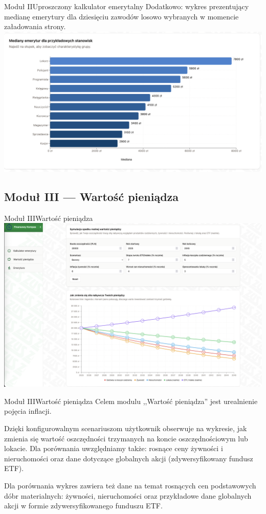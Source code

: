 \begin{frame}[t]{Moduł II}{Uproszczony kalkulator emerytalny}
Dodatkowo: wykres prezentujący medianę emerytury dla dziesięciu zawodów
losowo wybranych w momencie załadowania strony.
\\[2em]
\includegraphics[width=.8\textwidth]{img/module_2b_median_pensions}
\end{frame}

\subsection{Moduł III --- Wartość pieniądza}

\begin{frame}[t]{Moduł III}{Wartość pieniądza}
  \includegraphics[width=.8\textwidth]{img/module_3_the_value_of_money}
\end{frame}

\begin{frame}[t]{Moduł III}{Wartość pieniądza}
Celem modulu ,,Wartość pieniądza'' jest urealnienie pojęcia inflacji.

\pause
Dzięki konfigurowalnym scenariuszom użytkownik obserwuje na wykresie,
jak zmienia się wartość oszczędności trzymanych na koncie oszczędnościowym lub lokacie.
\pause
Dla porównania uwzględniamy także: rosnące ceny żywności i nieruchomości
oraz dane dotyczące globalnych akcji (zdywersyfikowany fundusz ETF).


\pause Dla porównania wykres zawiera też dane
na temat rosnących cen podstawowych dóbr materialnych: żywności, nieruchomości
oraz przykładowe dane globalnych akcji w formie zdywersyfikowanego funduszu ETF.
\end{frame}

